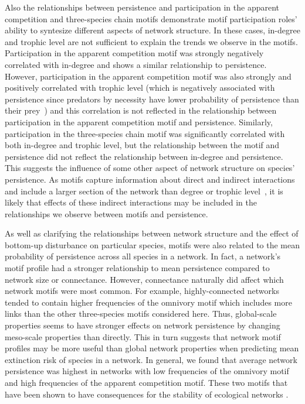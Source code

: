 \documentclass[12pt]{article}
\begin{document}
\begin{spacing}{2.0}
Also the relationships between persistence and participation in the apparent competition and three-species chain motifs demonstrate motif participation roles' ability to syntesize different aspects of network structure.
In these cases, in-degree and trophic level are not sufficient to explain the trends we observe in the motifs.
Participation in the apparent competition motif was strongly negatively correlated with in-degree and shows a similar relationship to persistence.
However, participation in the apparent competition motif was also strongly and positively correlated with trophic level (which is negatively associated with persistence since predators by necessity have lower probability of persistence than their prey~\citep{Eklof2013}) and this correlation is not reflected in the relationship between participation in the apparent competition motif and persistence.
Similarly, participation in the three-species chain motif was significantly correlated with both in-degree and trophic level, but the relationship between the motif and persistence did not reflect the relationship between in-degree and persistence.
This suggests the influence of some other aspect of network structure on species' persistence.
As motifs capture information about direct and indirect interactions and include a larger section of the network than degree or trophic level~\citep{Cirtwill2018FoodWebs}, it is likely that effects of these indirect interactions may be included in the relationships we observe between motifs and persistence.


As well as clarifying the relationships between network structure and the effect of bottom-up disturbance on particular species, motifs were also related to the mean probability of persistence across all species in a network.
In fact, a network's motif profile had a stronger relationship to mean persistence compared to network size or connectance. 
However, connectance naturally did affect which network motifs were most common. 
For example, highly-connected networks tended to contain higher frequencies of the omnivory motif which includes more links than the other three-species motifs considered here.
Thus, global-scale properties seems to have stronger effects on network persistence by changing meso-scale properties than directly.
This in turn suggests that network motif profiles may be more useful than global network properties when predicting mean extinction risk of species in a network.
In general, we found that average network persistence was highest in networks with low frequencies of the omnivory motif and high frequencies of the apparent competition motif. These two motifs that have been shown to have consequences for the stability of ecological networks \citep{Borrelli2015a}.


\end{spacing}
\end{document}
